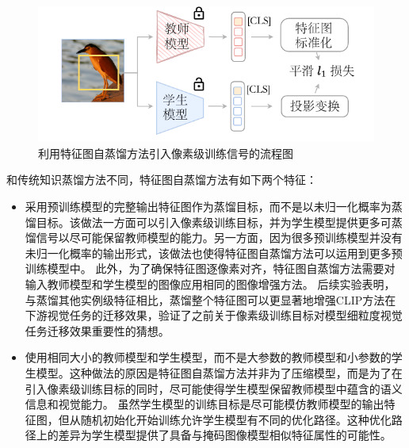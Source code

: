 \begin{figure}
  \centering
  \includegraphics[width=0.8\linewidth]{figures/fd-overall.pdf}
  \caption{利用特征图自蒸馏方法引入像素级训练信号的流程图}
  \label{fig:fd-overall}
\end{figure}

和传统知识蒸馏方法不同，特征图自蒸馏方法有如下两个特征：
\begin{itemize}
    \item 采用预训练模型的完整输出特征图作为蒸馏目标，而不是以未归一化概率为蒸馏目标\cite{hinton2015knowledge,deit}。该做法一方面可以引入像素级训练目标，并为学生模型提供更多可蒸馏信号以尽可能保留教师模型的能力。另一方面，因为很多预训练模型\cite{dino}并没有未归一化概率的输出形式，该做法也使得特征图自蒸馏方法可以运用到更多预训练模型中。
    此外，为了确保特征图逐像素对齐，特征图自蒸馏方法需要对输入教师模型和学生模型的图像应用相同的图像增强方法。
    后续实验表明，与蒸馏其他实例级特征相比，蒸馏整个特征图可以更显著地增强CLIP方法在下游视觉任务的迁移效果，验证了之前关于像素级训练目标对模型细粒度视觉任务迁移效果重要性的猜想。
    \item 使用相同大小的教师模型和学生模型，而不是大参数的教师模型和小参数的学生模型。这种做法的原因是特征图自蒸馏方法并非为了压缩模型，而是为了在引入像素级训练目标的同时，尽可能使得学生模型保留教师模型中蕴含的语义信息和视觉能力。
    虽然学生模型的训练目标是尽可能模仿教师模型的输出特征图，但从随机初始化开始训练允许学生模型有不同的优化路径。这种优化路径上的差异为学生模型提供了具备与掩码图像模型相似特征属性的可能性。
\end{itemize}


